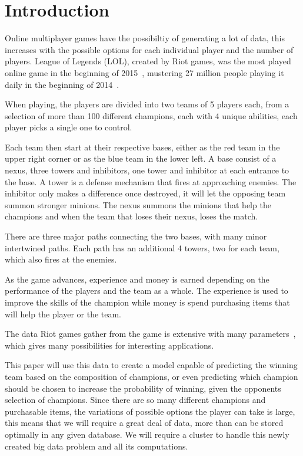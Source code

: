 \section{Introduction}\label{sec:intro}

Online multiplayer games have the possibiltiy of generating a lot of data, this increases with the possible options for each individual player and the number of players. 
League of Legends (LOL), created by Riot games, was the most played online game in the beginning of 2015~\cite{LoLmostplayed}, mustering 27 million people playing it daily in the beginning of 2014~\cite{LoL27mill}. 

When playing, the players are divided into two teams of 5 players each, from a selection of more than 100 different champions, each with 4 unique abilities, each player picks a single one to control.

Each team then start at their respective bases, either as the red team in the upper right corner or as the blue team in the lower left. 
A base consist of a nexus, three towers and inhibitors, one tower and inhibitor at each entrance to the base. A tower is a defense mechanism that fires at approaching enemies. The inhibitor only makes a difference once destroyed, it will let the opposing team summon stronger minions. The nexus summons the minions that help the champions and when the team that loses their nexus, loses the match.

There are three major paths connecting the two bases, with many minor intertwined paths. Each path has an additional 4 towers, two for each team, which also fires at the enemies.

As the game advances, experience and money is earned depending on the performance of the players and the team as a whole. The experience is used to improve the skills of the champion while money is spend purchasing items that will help the player or the team. 

The data Riot games gather from the game is extensive with many parameters~\cite{LoLparameters}, which gives many possibilities for interesting applications. 

This paper will use this data to create a model capable of predicting the winning team based on the composition of champions, or even predicting which champion should be chosen to increase the probability of winning, given the opponents selection of champions. Since there are so many different champions and purchasable items, the variations of possible options the player can take is large, this means that we will require a great deal of data, more than can be stored optimally in any given database. We will require a cluster to handle this newly created big data problem and all its computations.


